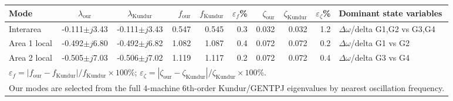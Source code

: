 \begingroup\scriptsize\setlength{\tabcolsep}{3pt}
\begin{tabular}{l c c r r r r r r p{2.6cm}}
\toprule
Mode & $\lambda_{\text{our}}$ & $\lambda_{\text{Kundur}}$ & $f_{\text{our}}$ & $f_{\text{Kundur}}$ & $\varepsilon_f$\% & $\zeta_{\text{our}}$ & $\zeta_{\text{Kundur}}$ & $\varepsilon_\zeta$\% & Dominant state variables\\
\midrule
Interarea & -0.111$\pm j$3.43 & -0.111$\pm j$3.43 & 0.547 & 0.545 & 0.3 & 0.032 & 0.032 & 1.2 & $\Delta\omega$/delta G1,G2 vs G3,G4\\
Area 1 local & -0.492$\pm j$6.80 & -0.492$\pm j$6.82 & 1.082 & 1.087 & 0.4 & 0.072 & 0.072 & 0.2 & $\Delta\omega$/delta G1 vs G2\\
Area 2 local & -0.505$\pm j$7.03 & -0.506$\pm j$7.02 & 1.119 & 1.117 & 0.2 & 0.072 & 0.072 & 0.4 & $\Delta\omega$/delta G3 vs G4\\
\bottomrule
\multicolumn{10}{l}{\scriptsize $\varepsilon_f=|f_{\text{our}}-f_{\text{Kundur}}|/f_{\text{Kundur}}\times100\%$; $\varepsilon_\zeta=|\zeta_{\text{our}}-\zeta_{\text{Kundur}}|/\zeta_{\text{Kundur}}\times100\%$.}\\
\multicolumn{10}{l}{\scriptsize Our modes are selected from the full 4-machine 6th-order Kundur/GENTPJ eigenvalues by nearest oscillation frequency.}
\end{tabular}
\endgroup
